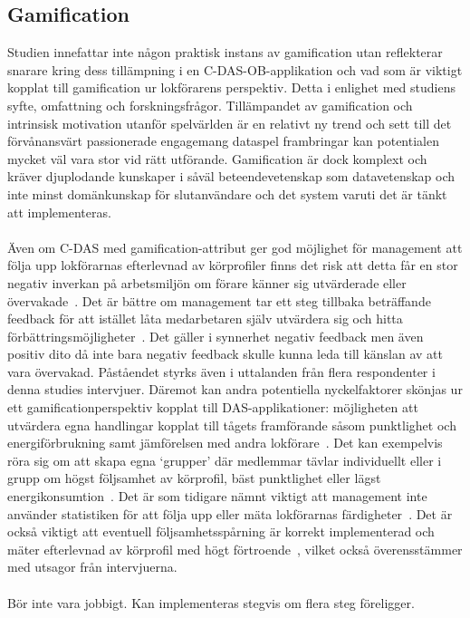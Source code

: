 \subsection{Gamification}
Studien innefattar inte någon praktisk instans av gamification utan reflekterar snarare kring dess tillämpning i en C-DAS-OB-applikation och vad som är viktigt kopplat till gamification ur lokförarens perspektiv.
Detta i enlighet med studiens syfte, omfattning och forskningsfrågor.
Tillämpandet av gamification och intrinsisk motivation utanför spelvärlden är en relativt ny trend och sett till det förvånansvärt passionerade engagemang dataspel frambringar kan potentialen mycket väl vara stor vid rätt utförande.
Gamification är dock komplext och kräver djuplodande kunskaper i såväl beteendevetenskap som datavetenskap och inte minst domänkunskap för slutanvändare och det system varuti det är tänkt att implementeras.
\paragraph{}
\hspace{-11}Även om C-DAS med gamification-attribut ger god möjlighet för management att följa upp lokförarnas efterlevnad av körprofiler finns det risk att detta får en stor negativ inverkan på arbetsmiljön om förare känner sig utvärderade eller övervakade~\cite{Bae2014}.
Det är bättre om management tar ett steg tillbaka beträffande feedback för att istället låta medarbetaren själv utvärdera sig och hitta förbättringsmöjligheter~\cite{Cwil2018}.
Det gäller i synnerhet negativ feedback men även positiv dito då inte bara negativ feedback skulle kunna leda till känslan av att vara övervakad.
Påståendet styrks även i uttalanden från flera respondenter i denna studies intervjuer.
Däremot kan andra potentiella nyckelfaktorer skönjas ur ett gamificationperspektiv kopplat till DAS-applikationer: möjligheten att utvärdera egna handlingar kopplat till tågets framförande såsom punktlighet och energiförbrukning samt jämförelsen med andra lokförare~\cite{Bae2014, Cwil2018}.
Det kan exempelvis röra sig om att skapa egna \lq{}grupper\rq{} där medlemmar tävlar individuellt eller i grupp om högst följsamhet av körprofil, bäst punktlighet eller lägst energikonsumtion~\cite{Bae2014}.
Det är som tidigare nämnt viktigt att management inte använder statistiken för att följa upp eller mäta lokförarnas färdigheter~\cite{Bae2014}.
Det är också viktigt att eventuell följsamhetsspårning är korrekt implementerad och mäter efterlevnad av körprofil med högt förtroende~\cite{Bae2014}, vilket också överensstämmer med utsagor från intervjuerna.
\paragraph{}
\hspace{-11}Bör inte vara jobbigt.
Kan implementeras stegvis om flera steg föreligger.
